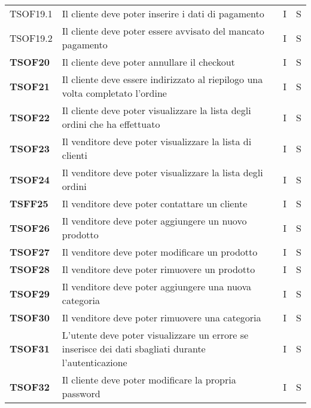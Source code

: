 \begin{center}
\begin{longtable}[!h]{p{60px} p{240px} p{35px} p{35px}}
        TSOF19.1        & Il cliente deve poter inserire i dati di pagamento                                                  & I              & S              \\
        TSOF19.2        & Il cliente deve poter essere avvisato del mancato pagamento                                         & I              & S              \\
        \textbf{TSOF20} & Il cliente deve poter annullare il checkout                                                         & I              & S              \\
        \textbf{TSOF21} & Il cliente deve essere indirizzato al riepilogo una volta completato l'ordine                       & I              & S              \\
        \textbf{TSOF22} & Il cliente deve poter visualizzare la lista degli ordini che ha effettuato                          & I              & S              \\
        \textbf{TSOF23} & Il venditore deve poter visualizzare la lista di clienti                                            & I              & S              \\
        \textbf{TSOF24} & Il venditore deve poter visualizzare la lista degli ordini                                          & I              & S              \\
        \textbf{TSFF25} & Il venditore deve poter contattare un cliente                                                       & I              & S              \\
        \textbf{TSOF26} & Il venditore deve poter aggiungere un nuovo prodotto                                                & I              & S              \\
        \textbf{TSOF27} & Il venditore deve poter modificare un prodotto                                                      & I              & S              \\
        \textbf{TSOF28} & Il venditore deve poter rimuovere un prodotto                                                       & I              & S              \\
        \textbf{TSOF29} & Il venditore deve poter aggiungere una nuova categoria                                              & I              & S              \\
        \textbf{TSOF30} & Il venditore deve poter rimuovere una categoria                                                     & I              & S              \\
        \textbf{TSOF31} & L'utente deve poter visualizzare un errore se inserisce dei dati sbagliati durante l'autenticazione & I              & S              \\
        \textbf{TSOF32} & Il cliente deve poter modificare la propria password                                                & I              & S              \\
    \end{longtable}
\end{center}
\pagebreak
